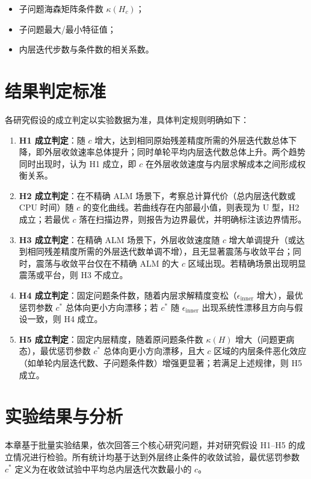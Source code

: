 \documentclass[UTF8]{ctexart}
\numberwithin{figure}{section}
\theoremstyle{definition}
\theoremstyle{examplestyle}
\theoremstyle{remark}
\begin{document}
\begin{itemize}
\item 子问题海森矩阵条件数 $\kappa(H_c)$；
\item 子问题最大/最小特征值；
\item 内层迭代步数与条件数的相关系数。
\end{itemize}

\section{结果判定标准}
\label{sec:verdict}

各研究假设的成立判定以实验数据为准，具体判定规则明确如下：

\begin{enumerate}
\item \textbf{H1 成立判定}：随 $c$ 增大，达到相同原始残差精度所需的外层迭代数总体下降，即外层收敛速率总体提升；同时单轮平均内层迭代数总体上升。两个趋势同时出现时，认为 H1 成立，即 $c$ 在外层收敛速度与内层求解成本之间形成权衡关系。
\item \textbf{H2 成立判定}：在不精确 ALM 场景下，考察总计算代价（总内层迭代数或 CPU 时间）随 $c$ 的变化曲线。若曲线存在内部最小值，则表现为 U 型，H2 成立；若最优 $c$ 落在扫描边界，则报告为边界最优，并明确标注该边界情形。
\item \textbf{H3 成立判定}：在精确 ALM 场景下，外层收敛速度随 $c$ 增大单调提升（或达到相同残差精度所需的外层迭代数单调不增），且无显著震荡与收敛平台；同时，震荡与收敛平台仅在不精确 ALM 的大 $c$ 区域出现。若精确场景出现明显震荡或平台，则 H3 不成立。
\item \textbf{H4 成立判定}：固定问题条件数，随着内层求解精度变松（$\epsilon_{\mathrm{inner}}$ 增大），最优惩罚参数 $c^*$ 总体向更小方向漂移；若 $c^*$ 随 $\epsilon_{\mathrm{inner}}$ 出现系统性漂移且方向与假设一致，则 H4 成立。
\item \textbf{H5 成立判定}：固定内层精度，随着原问题条件数 $\kappa(H)$ 增大（问题更病态），最优惩罚参数 $c^*$ 总体向更小方向漂移，且大 $c$ 区域的内层条件恶化效应（如单轮内层迭代数、子问题条件数）增强更显著；若满足上述规律，则 H5 成立。
\end{enumerate}

\section{实验结果与分析}
\label{sec:results}

本章基于批量实验结果，依次回答三个核心研究问题，并对研究假设 H1--H5 的成立情况进行检验。所有统计均基于达到外层终止条件的收敛试验，最优惩罚参数 $c^*$ 定义为在收敛试验中平均总内层迭代次数最小的 $c$。
\end{document}
